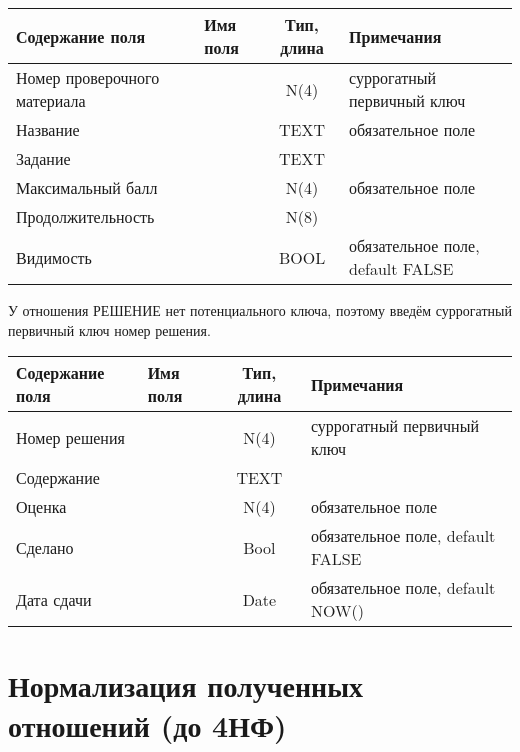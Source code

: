 \documentclass[a4paper,14pt]{article}
\begin{document}
\begin{table}[H]
	\begin{tabular}{|l|l|c|l|}
		\hline
		Содержание поля              & Имя поля & Тип, длина & Примечания                       \\ \hline
		Номер проверочного материала &          &    N(4)    & суррогатный первичный ключ       \\ \hline
		Название                     &          &    TEXT    & обязательное поле                \\ \hline
		Задание                      &          &    TEXT    &                                  \\ \hline
		Максимальный балл            &          &    N(4)    & обязательное поле                \\ \hline
		Продолжительность            &          &    N(8)    &                                  \\ \hline
		Видимость                    &          &    BOOL    & обязательное поле, default FALSE \\ \hline
	\end{tabular}
\end{table}


У отношения РЕШЕНИЕ нет потенциального ключа, поэтому введём суррогатный первичный ключ номер решения.

\begin{table}[H]
	\begin{tabular}{|l|l|c|l|}
		\hline
		Содержание поля & Имя поля & Тип, длина & Примечания                       \\ \hline
		Номер решения   &          &    N(4)    & суррогатный первичный ключ       \\ \hline
		Содержание      &          &    TEXT    &                                  \\ \hline
		Оценка          &          &    N(4)    & обязательное поле                \\ \hline
		Сделано         &          &    Bool    & обязательное поле, default FALSE \\ \hline
		Дата сдачи      &          &    Date    & обязательное поле, default NOW() \\ \hline
	\end{tabular}
\end{table}



\section{Нормализация полученных отношений (до 4НФ)}
\end{document}

